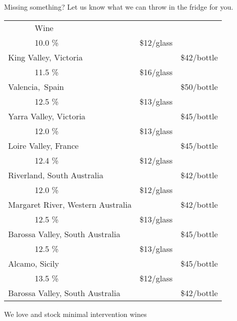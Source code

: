 \documentclass[12pt]{article}
\makeatletter
\newcommand*\ColText[1]{\textcolor{SpringGreen4}{#1}}
\newcommand*\GroupGlassTitle[2]{%
  \noalign{\vspace{2em}}
  \fontfamily{qzc}\selectfont #2 & \vspace{1em}\fontsize{20}{29}\selectfont\ColText{#1}}
\newenvironment{Group}
  {\vspace{2em}\noindent\begin{tabular*}{\textwidth}{@{} p{10mm} l@{\extracolsep{\fill}} r@{\hspace{1em}} r@{}}} %
  {\end{tabular*}}
\newcommand*\Booze[3]{%
  \noalign{\vspace{1em}}
  \multicolumn{2}{l}{ #1 \tiny\dotfill } & \scriptsize #2 \% \tiny\dotfill & \normalsize \$#3}
\newcommand*\Wine[5]{%
  \noalign{\vspace{0.5em}}
  \Booze{#1}{#3}{#4\tiny/glass} \\
  \multicolumn{2}{l}{ \hspace*{0.1em} \scriptsize #2 } & {} & \normalsize \$#5\tiny/bottle}
\newcommand*\Glass[2]{%
    \begin{tikzpicture}[remember picture,overlay]
        \node[xshift=5mm,yshift=0mm]{%
            \texttt{[image: Glasses/\#1.png]}
        };
    \end{tikzpicture}%
}
\newcommand*\GlassWine{%
    \Glass{wine}{4.5mm}}
\makeatother
\begin{document}
\vfill
\begin{center}
	Missing something? Let us know what we can throw in the fridge for you.
\end{center}
\pagebreak
\begin{Group}
    \GroupGlassTitle{Wine}{\GlassWine} \\
    \Wine{Puncheon Darts \textbf{Prosecco}}{King Valley, Victoria}{10.0}{12}{42} \\
    \Wine{Tharsys Cava Brut Nature}{Valencia, Spain}{11.5}{16}{50} \\
    \Wine{Lighthand \textbf{Chardonnay}}{Yarra Valley, Victoria}{12.5}{13}{45} \\
    \Wine{Guy Allion \textbf{Sauvignon Blanc}}{Loire Valley, France}{12.0}{13}{45} \\
    \Wine{Continental Platter Delirium \textbf{Orange}}{Riverland, South Australia}{12.4}{12}{42} \\
    \Wine{Continental Platter \textbf{Rosé}}{Margaret River, Western Australia}{12.0}{12}{42} \\
    \Wine{Quin Everyday Explorer Mataro \textbf{Rosé}}{Barossa Valley, South Australia}{12.5}{13}{45} \\
    \Wine{Ciello Rossa \textbf{Nero d'Avalo}}{Alcamo, Sicily}{12.5}{13}{45} \\
    \Wine{Continental Platter \textbf{Shiraz}}{Barossa Valley, South Australia}{13.5}{12}{42} \\
\end{Group}
\vfill
\begin{center}
	We love and stock minimal intervention wines
\end{center}
\pagebreak
\end{document}

